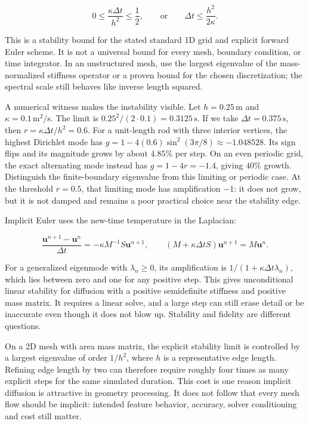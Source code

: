 \[
0\le\frac{\kappa\Delta t}{h^2}\le\frac12,
\qquad\text{or}\qquad
\Delta t\le\frac{h^2}{2\kappa}.
\]

This is a stability bound for the stated standard 1D grid and explicit forward Euler scheme. It is not a universal bound for every mesh, boundary condition, or time integrator. In an unstructured mesh, use the largest eigenvalue of the mass-normalized stiffness operator or a proven bound for the chosen discretization; the spectral scale still behaves like inverse length squared.

A numerical witness makes the instability visible. Let \(h=0.25\,\mathrm m\) and \(\kappa=0.1\,\mathrm{m^2/s}\). The limit is \(0.25^2/(2\cdot0.1)=0.3125\,\mathrm s\). If we take \(\Delta t=0.375\,\mathrm s\), then \(r=\kappa\Delta t/h^2=0.6\). For a unit-length rod with three interior vertices, the highest Dirichlet mode has \(g=1-4(0.6)\sin^2(3\pi/8)\approx-1.048528\). Its sign flips and its magnitude grows by about \(4.85\%\) per step. On an even periodic grid, the exact alternating mode instead has \(g=1-4r=-1.4\), giving \(40\%\) growth. Distinguish the finite-boundary eigenvalue from this limiting or periodic case. At the threshold \(r=0.5\), that limiting mode has amplification \(-1\): it does not grow, but it is not damped and remains a poor practical choice near the stability edge.

Implicit Euler uses the new-time temperature in the Laplacian:

\[
\frac{\mathbf u^{n+1}-\mathbf u^n}{\Delta t}=-\kappa M^{-1}S\mathbf u^{n+1},
\qquad
(M+\kappa\Delta tS)\mathbf u^{n+1}=M\mathbf u^n.
\]

For a generalized eigenmode with \(\lambda_n\ge0\), its amplification is \(1/(1+\kappa\Delta t\lambda_n)\), which lies between zero and one for any positive step. This gives unconditional linear stability for diffusion with a positive semidefinite stiffness and positive mass matrix. It requires a linear solve, and a large step can still erase detail or be inaccurate even though it does not blow up. Stability and fidelity are different questions.

On a 2D mesh with area mass matrix, the explicit stability limit is controlled by a largest eigenvalue of order \(1/h^2\), where \(h\) is a representative edge length. Refining edge length by two can therefore require roughly four times as many explicit steps for the same simulated duration. This cost is one reason implicit diffusion is attractive in geometry processing. It does not follow that every mesh flow should be implicit: intended feature behavior, accuracy, solver conditioning and cost still matter.

